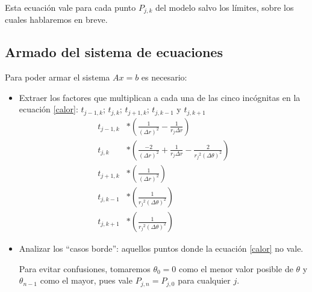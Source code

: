 Esta ecuación vale para cada punto $P_{j, k}$ del modelo salvo los límites, sobre los cuales hablaremos en breve.

\subsection{Armado del sistema de ecuaciones}
Para poder armar el sistema $Ax=b$ es necesario:
\begin{itemize}
 \item
    Extraer los factores que multiplican a cada una de las cinco incógnitas en la ecuación \ref{calor}: $t_{j-1,k}$; $t_{j,k}$; $t_{j+1,k}$; $t_{j,k-1}$ y $t_{j,k+1}$
    \begin{align*}
        t_{j-1, k}&*\left(\frac{1}{(\Delta r)^2} - \frac{1}{r_j \Delta r}\right) \\
        t_{j, k}  &*\left(\frac{-2}{(\Delta r)^2} + \frac{1}{r_j \Delta r} - \frac{2}{{r_j}^2 (\Delta \theta)^2}\right) \\
        t_{j+1, k}&*\left(\frac{1}{(\Delta r)^2}\right) \\
        t_{j, k-1}&*\left(\frac{1}{{r_j}^2(\Delta \theta)^2}\right) \\
        t_{j, k+1}&*\left(\frac{1}{{r_j}^2(\Delta \theta)^2}\right)
    \end{align*}

 \item
    Analizar los ``casos borde'': aquellos puntos donde la ecuación \ref{calor} no vale.
    
    Para evitar confusiones, tomaremos $\theta_0 = 0$ como el menor valor posible de $\theta$ y $\theta_{n-1}$ como el mayor, pues vale $P_{j, n} = P_{j, 0}$ para cualquier $j$. 
    

\end{itemize}
